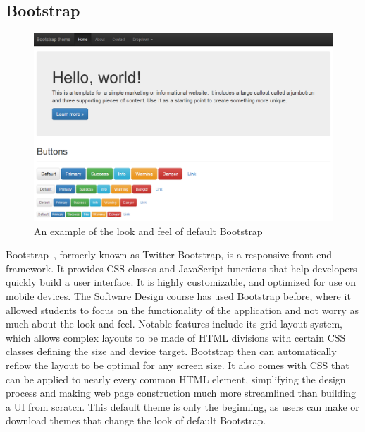 \documentclass[12pt]{article}
\begin{document}
\subsection{Bootstrap}\label{sec:bootstrap}
\begin{figure}[h!]
\includegraphics[width=\linewidth]{img/bootstrap.png}
\caption{An example of the look and feel of default Bootstrap}
\end{figure}
Bootstrap~\cite{Bootstrap}, formerly known as Twitter Bootstrap, is a responsive front-end framework. It provides CSS classes and JavaScript functions that help developers quickly build a user interface. It is highly customizable, and optimized for use on mobile devices. The Software Design course has used Bootstrap before, where it allowed students to focus on the functionality of the application and not worry as much about the look and feel. Notable features include its grid layout system, which allows complex layouts to be made of HTML divisions with certain CSS classes defining the size and device target. Bootstrap then can automatically reflow the layout to be optimal for any screen size.
 It also comes with CSS that can be applied to nearly every common HTML element, simplifying the design process and making web page construction much more streamlined than building a UI from scratch. This default theme is only the beginning, as users can make or download themes that change the look of default Bootstrap.
\end{document}
